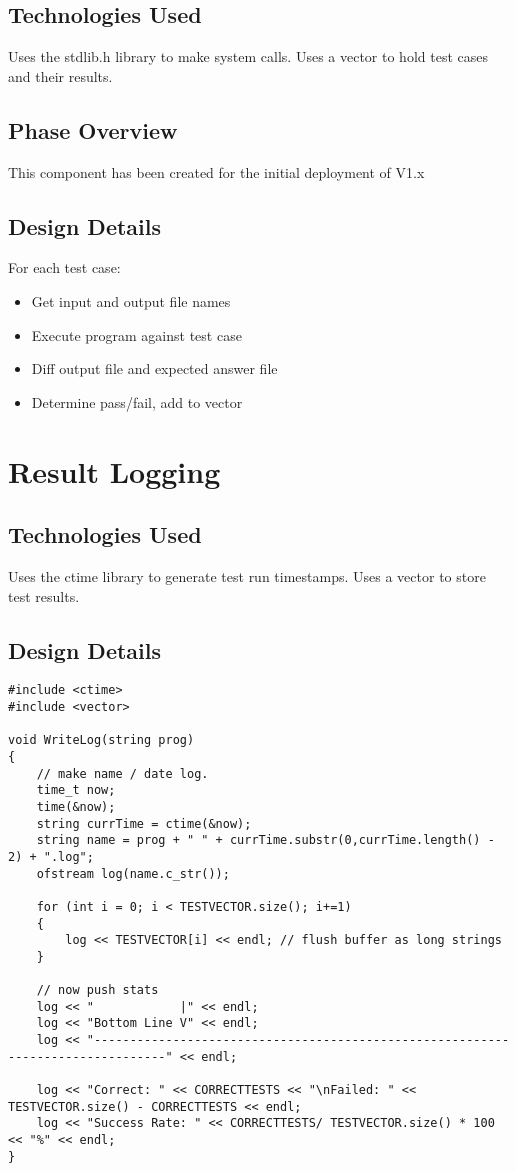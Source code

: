 \subsection{Technologies  Used}
Uses the stdlib.h library to make system calls.\newline
Uses a vector to hold test cases and their results.

\subsection {Phase Overview}
This component has been created for the initial deployment of V1.x

\subsection{Design Details}
 For each test case:
\begin{itemize}
\item Get input and output file names
\item Execute program against test case
\item Diff output file and expected answer file
\item Determine pass/fail, add to vector
\end{itemize}

\section{Result Logging}

\subsection{Technologies Used}
Uses the ctime library to generate test run timestamps.\newline
Uses a vector to store test results.

\subsection{Design Details} 
\begin{lstlisting}
#include <ctime>
#include <vector>

void WriteLog(string prog)
{
    // make name / date log.
    time_t now;
    time(&now);
    string currTime = ctime(&now);
    string name = prog + " " + currTime.substr(0,currTime.length() - 2) + ".log";
    ofstream log(name.c_str());

    for (int i = 0; i < TESTVECTOR.size(); i+=1)
    {
        log << TESTVECTOR[i] << endl; // flush buffer as long strings
    }

    // now push stats
    log << "            |" << endl;
    log << "Bottom Line V" << endl;
    log << "--------------------------------------------------------------------------------" << endl;

    log << "Correct: " << CORRECTTESTS << "\nFailed: " << TESTVECTOR.size() - CORRECTTESTS << endl;
    log << "Success Rate: " << CORRECTTESTS/ TESTVECTOR.size() * 100 << "%" << endl; 
}
\end{lstlisting}